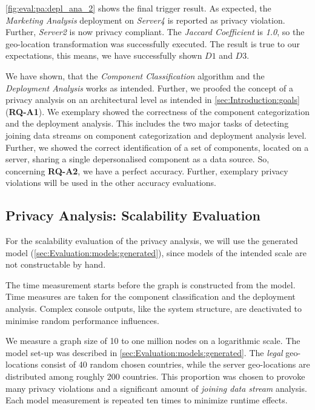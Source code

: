 \autoref{fig:eval:pa:depl_ana_2} shows the final trigger result. As expected, the \textit{Marketing Analysis} deployment on \textit{Server4} is reported as privacy violation. Further, \textit{Server2} is now privacy compliant. The \textit{Jaccard Coefficient} is \textit{1.0}, so the geo-location transformation was successfully executed. The result is true to our expectations, this means, we have successfully shown $D1$ and $D3$.

We have shown, that the \textit{Component Classification} algorithm and the \textit{Deployment Analysis} works as intended. Further, we proofed the concept of a privacy analysis on an architectural level as intended in \autoref{sec:Introduction:goals} (\textbf{RQ-A1}). We exemplary showed the correctness of the component categorization and the deployment analysis. This includes the two major tasks of detecting joining data streams on component categorization and deployment analysis level. Further, we showed the correct identification of a set of components, located on a server, sharing a single depersonalised component as a data source. So, concerning \textbf{RQ-A2}, we have a perfect accuracy. Further, exemplary privacy violations will be used in the other accuracy evaluations.

\subsection{Privacy Analysis: Scalability Evaluation}
\label{sec:Evaluation:privacyanalysis:scale}

For the scalability evaluation of the privacy analysis, we will use the generated model (\autoref{sec:Evaluation:models:generated}), since models of the intended scale are not constructable by hand.

The time measurement starts before the graph is constructed from the model. Time measures are taken for the component classification and the deployment analysis. Complex console outputs, like the system structure, are deactivated to minimise random performance influences.

We measure a graph size of 10 to one million nodes on a logarithmic scale. The model set-up was described in \autoref{sec:Evaluation:models:generated}. The \textit{legal} geo-locations consist of 40 random chosen countries, while the server geo-locations are distributed among roughly 200 countries. This proportion was chosen to provoke many privacy violations and a significant amount of \textit{joining data stream} analysis. Each model measurement is repeated ten times to minimize runtime effects.

